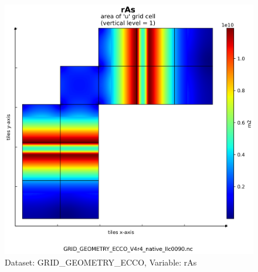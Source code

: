 \begin{figure}[H]
\centering
\includegraphics[scale=0.55]{../images/plots/v4r4/native_plots_coords/Geometry_Parameters_for_the_Lat-Lon-Cap_90_(llc90)_Native_Model_Grid_(Version_4_Release_4)/rAs.png}
\caption{Dataset: GRID\_GEOMETRY\_ECCO, Variable: rAs}
\label{tab:table-GRID_GEOMETRY_ECCO_rAs-Plot}
\end{figure}
\newpage
\pagebreak

